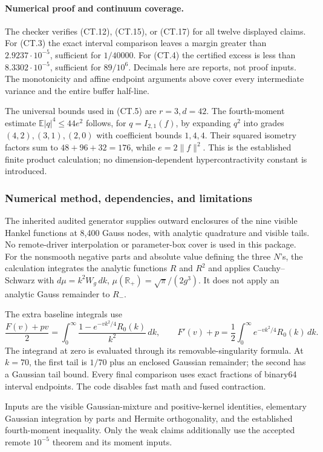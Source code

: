 \paragraph{Numerical proof and continuum coverage.}
The checker verifies (CT.12), (CT.15), or (CT.17) for all twelve
displayed claims. For (CT.3) the exact interval comparison leaves
a margin greater than \(2.9237\cdot10^{-5}\), sufficient for
\(1/40000\). For (CT.4) the certified excess is less than
\(8.3302\cdot10^{-5}\), sufficient for \(89/10^6\).
Decimals here are reports, not proof inputs. The monotonicity and
affine endpoint arguments above cover every intermediate variance
and the entire buffer half-line.

The universal bounds used in (CT.5) are \(r=3,d=42\).
The fourth-moment estimate \(\mathbb E|q|^4\le44e^2\) follows,
for \(q=I_{2,1}(f)\), by expanding \(q^2\) into grades
\((4,2),(3,1),(2,0)\) with coefficient bounds \(1,4,4\).
Their squared isometry factors sum to \(48+96+32=176\), while
\(e=2\|f\|^2\). This is the established finite product calculation;
no dimension-dependent hypercontractivity constant is introduced.

\subsubsection{Numerical method, dependencies, and limitations}
The inherited audited generator supplies outward enclosures of the
nine visible Hankel functions at 8,400 Gauss nodes, with analytic
quadrature and visible tails. No remote-driver interpolation or
parameter-box cover is used in this package.
For the nonsmooth negative parts and absolute value defining the
three \(N\)'s, the calculation integrates the analytic functions
\(R\) and \(R^2\) and applies Cauchy--Schwarz with
\(d\mu=k^2W_g\,dk\), \(\mu(\mathbb R_+)=\sqrt\pi/(2g^3)\).
It does not apply an analytic Gauss remainder to \(R_-\).

The extra baseline integrals use
\[
 \frac{F(v)+pv}{2}
 =\int_0^\infty\frac{1-e^{-vk^2/4}R_0(k)}{k^2}\,dk,\qquad
 F'(v)+p=\frac12\int_0^\infty e^{-vk^2/4}R_0(k)\,dk.
\]
The integrand at zero is evaluated through its removable-singularity
formula. At \(k=70\), the first tail is \(1/70\) plus an enclosed
Gaussian remainder; the second has a Gaussian tail bound.
Every final comparison uses exact fractions of binary64 interval
endpoints. The code disables fast math and fused contraction.

Inputs are the visible Gaussian-mixture and positive-kernel
identities, elementary Gaussian integration by parts and Hermite
orthogonality, and the established fourth-moment inequality.
Only the weak claims additionally use the accepted remote
\(10^{-5}\) theorem and its moment inputs.

